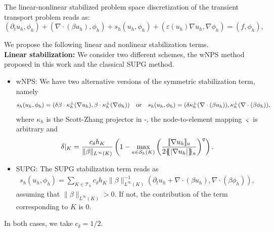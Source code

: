 \begin{algorithm}[Hhtbp]
\Indm
\small
\SetFillComment The linear-nonlinear stabilized problem space discretization of the transient transport problem reads as:
$$
(\partial_t u_h,\phi_h) +   (\nabla \cdot (\beta u_h),\phi_h) + s_h(u_h,\phi_h) + (\varepsilon(u_h) \nabla u_h, \nabla \phi_h) =  (f ,  \phi_h ),
$$

We propose the following linear and nonlinear stabilization terms.\\


{\bf Linear stabilization:} We consider two different schemes, the wNPS method proposed in this work and the classical SUPG method. 
\setlength{\leftmargini}{0pt}
\begin{itemize}
\item  wNPS: We have two alternative versions of the symmetric stabilization term, namely 
\begin{align*}
  s_h(u_h,\phi_h) = ( \delta \beta \cdot \kappa_h^{\perp}(\nabla u_h), \beta \cdot \kappa_h^{\perp}(\nabla \phi_h)) \quad \hbox{or} \quad 
s_h(u_h,\phi_h) = ( \delta \kappa_h^{\perp}(\nabla\cdot (\beta u_h)),  \kappa_h^{\perp}(\nabla\cdot (\beta \phi_h)), 
\end{align*}
where $\kappa_h$ is the Scott-Zhang projector in -, the node-to-element mapping $\varsigma$ is arbitrary and 
\begin{align*}%
\delta|_K = \frac{c_\delta h_K}{\|\beta\|_{L^\infty(K)}}\left(1-\max_{a \in \mathcal{S}_h(K)}\left(\frac{ \jump{\nabla u_h}_a }{2\mean{|\nabla u_h|}_a}\right)^q\right).
\end{align*}
\item SUPG: The SUPG stabilization term reads as
\begin{align*}%
s_h(u_h,\phi_h) = \sum_{K \in \mathcal{T}_h} c_{\delta} {h_K}{\| \beta \|_{L^\infty(K)}^{-1}}( \partial_t u_h + \nabla \cdot (\beta u_h), \nabla \cdot (\beta  \phi_h)), \nonumber 
\end{align*}
assuming that $\| \beta \|_{L^\infty(K)}>0$. If not, the contribution of the term corresponding to $K$ is $0$. 
\end{itemize}
In both cases, we take $c_\delta = 1/2$.


\end{algorithm}
